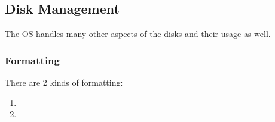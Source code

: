 \subsection{Disk Management}\label{subsec:Disk_Management}
The OS handles many other aspects of the disks and their usage as well.

\subsubsection{Formatting}\label{subsubsec:Formatting}
There are 2 kinds of formatting:
\begin{enumerate}[noitemsep]
\item {}
\item {}
\end{enumerate}


